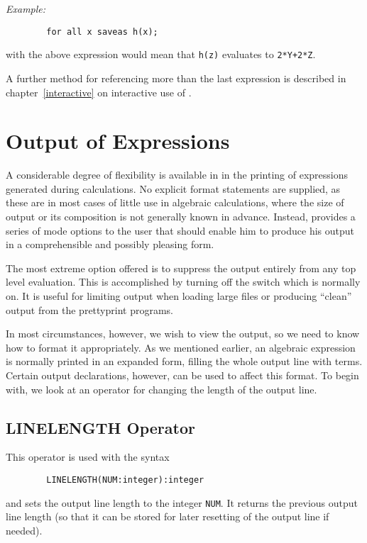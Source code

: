 \textit{Example:}
\begin{verbatim}
        for all x saveas h(x);
\end{verbatim}

with the above expression would mean that \texttt{h(z)} evaluates to
\texttt{2*Y+2*Z}.

A further method for referencing more than the last expression is described
in chapter~\ref{interactive} on interactive use of {\REDUCE}.


\section{Output of Expressions}

A considerable degree of flexibility is available in {\REDUCE} in the
printing of expressions generated during calculations.  No explicit format
statements are supplied, as these are in most cases of little use in
algebraic calculations, where the size of output or its composition is not
generally known in advance.  Instead, {\REDUCE} provides a series of mode
options to the user that should enable him to produce his output in a
comprehensible and possibly pleasing form.

\hypertarget{switch:OUTPUT}{}
The most extreme option offered is to suppress the output entirely from
any top level evaluation.  This is accomplished by turning off the switch
 which is normally on.  It is useful for
limiting output when loading large files or producing ``clean'' output from
the prettyprint programs.

In most circumstances, however, we wish to view the output, so we need to
know how to format it appropriately.  As we mentioned earlier, an
algebraic expression is normally printed in an expanded form, filling the
whole output line with terms.  Certain output declarations, however, can be used to affect this format.  To begin with,
we look at an operator for changing the length of the output line.

\subsection{LINELENGTH Operator}
\hypertarget{operator:LINELENGTH}{}

This operator is used with the syntax
\begin{verbatim}
        LINELENGTH(NUM:integer):integer
\end{verbatim}
and sets the output line length to the integer \texttt{NUM}. It returns the
previous output line length (so that it can be stored for later resetting
of the output line if needed).

